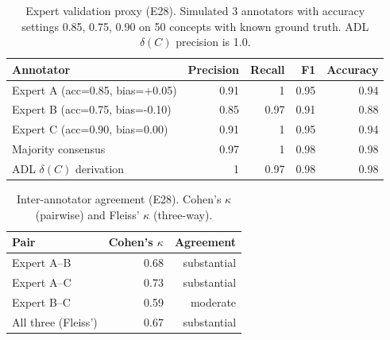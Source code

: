 \begin{table}[htbp]
\centering
\footnotesize
\caption{Expert validation proxy (E28). Simulated 3 annotators with accuracy settings 0.85, 0.75, 0.90 on 50 concepts with known ground truth. ADL $\delta(C)$ precision is 1.0.}
\label{tab:e28-results}
\begin{tabular}{@{}lrrrr@{}}
\toprule
\textbf{Annotator} & \textbf{Precision} & \textbf{Recall} & \textbf{F1} & \textbf{Accuracy} \\
\midrule
Expert A (acc=0.85, bias=+0.05) & 0.91 & 1 & 0.95 & 0.94 \\
Expert B (acc=0.75, bias=-0.10) & 0.85 & 0.97 & 0.91 & 0.88 \\
Expert C (acc=0.90, bias=0.00) & 0.91 & 1 & 0.95 & 0.94 \\
Majority consensus & 0.97 & 1 & 0.98 & 0.98 \\
ADL $\delta(C)$ derivation & 1 & 0.97 & 0.98 & 0.98 \\
\bottomrule
\end{tabular}
\end{table}

\begin{table}[htbp]
\centering
\footnotesize
\caption{Inter-annotator agreement (E28). Cohen's $\kappa$ (pairwise) and Fleiss' $\kappa$ (three-way).}
\label{tab:e28-agreement}
\begin{tabular}{@{}lrr@{}}
\toprule
\textbf{Pair} & \textbf{Cohen's $\kappa$} & \textbf{Agreement} \\
\midrule
Expert A--B & 0.68 & substantial \\
Expert A--C & 0.73 & substantial \\
Expert B--C & 0.59 & moderate \\
All three (Fleiss') & 0.67 & substantial \\
\bottomrule
\end{tabular}
\end{table}

